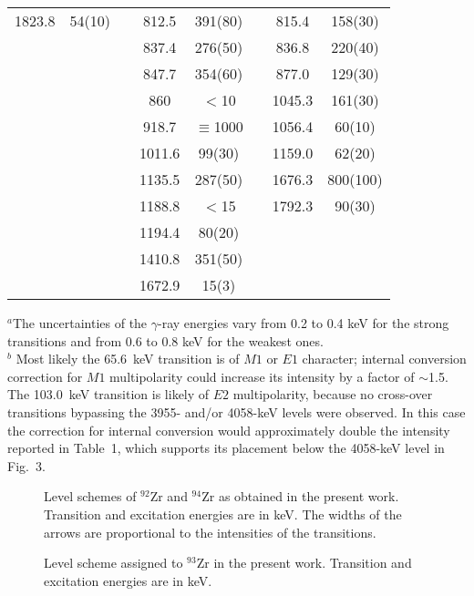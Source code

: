 \begin{table}
\begin{tabular}{cccccccc}
1823.8 &  54(10) & & 812.5 & 391(80) & & 815.4 & 158(30)  \\ [0.2cm]
       &         & & 837.4 & 276(50) & & 836.8 & 220(40)  \\ [0.2cm]
       &         & & 847.7 & 354(60) & & 877.0 & 129(30)  \\ [0.2cm]
       &         & & 860   & $<$10   & &1045.3 & 161(30)  \\ [0.2cm]
       &         & & 918.7 & $\equiv$1000 & &1056.4 &  60(10)      \\ [0.2cm]
       &         & &1011.6 &  99(30) & &1159.0 &  62(20)  \\ [0.2cm]
       &         & &1135.5 & 287(50) & &1676.3 & 800(100) \\ [0.2cm]
       &         & &1188.8 & $<$15   & &1792.3 &  90(30)  \\ [0.2cm]
       &         & &1194.4 &  80(20) & &       &          \\ [0.2cm]
       &         & &1410.8 & 351(50) & &       &          \\ [0.2cm]
       &         & &1672.9 &  15(3)  & &       &          \\ [0.2cm]
\end{tabular}
\end{table}
\noindent
 $^{a}$The uncertainties of the $\gamma$-ray energies vary from 0.2 to
 0.4 keV for the strong transitions and from 0.6 to 0.8 keV for the
 weakest ones.\\
\noindent
$^{b}$ Most likely the 65.6~keV transition is of $M1$ or $E1$ character; 
internal conversion correction for $M1$ multipolarity could 
increase its intensity by a factor of
$\sim$1.5. The 103.0~keV transition is likely of $E2$ multipolarity, because no
cross-over transitions bypassing the 3955- and/or 4058-keV levels were observed.
In this case the correction for internal conversion would approximately double
the intensity reported in Table~1, which supports its placement below the
4058-keV level in Fig.~3.

\begin{figure}
\caption[]{Level schemes of $^{92}$Zr and $^{94}$Zr as obtained in the present
work. Transition and excitation energies are in keV. The widths of the
arrows are proportional to the intensities of the transitions.} 
\end{figure}

\begin{figure}
\caption[]{Level scheme assigned to $^{93}$Zr in the present work.
 Transition and excitation energies are in keV.} 
\end{figure}

